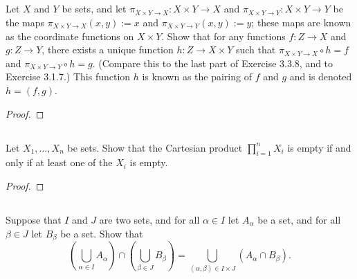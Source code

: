 \documentclass[../../main.tex]{subfiles}
\begin{document}
\addtocounter{subsection}{2}
\subsection{}
\begin{q}
    Let $X$ and $Y$ be sets, and let $\pi_{X\times Y\to X} : X \times Y \to X$ and $\pi_{X\times Y\to Y} : X \times Y \to Y$ be the maps $\pi_{X\times Y\to X}(x, y) := x$ and $\pi_{X\times Y\to Y}(x, y) := y$; these maps are known as the coordinate functions on $X\times Y$. Show that for any functions $f : Z \to X$ and $g : Z \to Y$, there exists a unique function $h : Z \to X \times Y$ such that $\pi_{X\times Y\to X} \circ h = f$ and $\pi_{X\times Y\to Y} \circ h = g$. (Compare this to the last part of Exercise 3.3.8, and to Exercise 3.1.7.) This function $h$ is known as the pairing of $f$ and $g$ and is denoted $h = (f, g)$.
\end{q}

\begin{proof}
    
\end{proof}
\begin{xx}
    
\end{xx}

\subsection{}
\begin{q}
    Let $X_1, \ldots, X_n$ be sets. Show that the Cartesian product $\prod_{i=1}^n X_i$ is empty if and only if at least one of the $X_i$ is empty.
\end{q}

\begin{proof}
    
\end{proof}
\begin{xx}
    
\end{xx}

\subsection{}
\begin{q}
    Suppose that $I$ and $J$ are two sets, and for all $\alpha \in I$ let $A_{\alpha}$ be a set, and for all $\beta \in J$ let $B_{\beta}$ be a set. Show that
        \[
        \left(\bigcup_{\alpha \in I} A_{\alpha}\right) \cap \left(\bigcup_{\beta \in J} B_{\beta}\right) = \bigcup_{(\alpha, \beta) \in I \times J} \left(A_{\alpha} \cap B_{\beta}\right).
        \]
\end{q}
\end{document}
